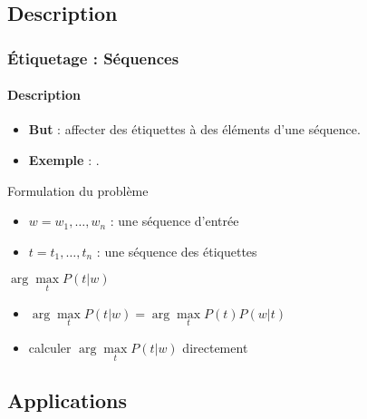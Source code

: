 \documentclass[xcolor=table]{beamer}
\begin{document}
\subsection{Description}

\begin{frame}
\frametitle{Étiquetage : Séquences}
\framesubtitle{Description}


\begin{itemize}
	\item \textbf{But} : affecter des étiquettes à des éléments d'une séquence. 
	\item \textbf{Exemple} : .
\end{itemize}

\begin{block}{Formulation du problème}
	\begin{itemize}
		\item $w = w_1, \ldots, w_n$ : une séquence d'entrée
		\item $t = t_1, \ldots, t_n$ : une séquence des étiquettes
	\end{itemize}
	\begin{center}
		$ \arg\max\limits_t P(t | w)$
	\end{center}
	
	\begin{itemize}
		\item {} $ \arg\max\limits_t P(t | w) = \arg\max\limits_t P(t) P(w | t) $
		\item {} calculer $\arg\max\limits_t P(t | w)$ directement
	\end{itemize}
\end{block}

\end{frame}

\subsection{Applications}
\end{document}
